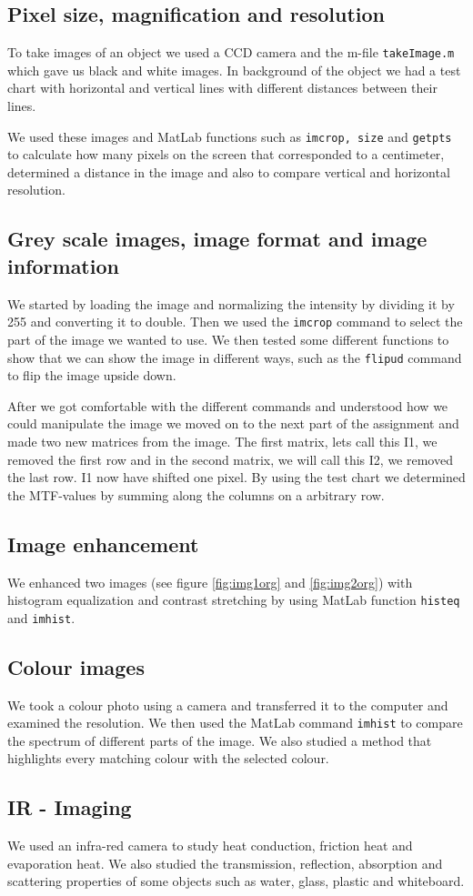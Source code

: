 \subsection{Pixel size, magnification and resolution}
To take images of an object we used a CCD camera and the m-file \texttt{takeImage.m} which gave us black and white images. In background of the object we had a test chart with horizontal and vertical lines with different distances between their lines. 

We used these images and MatLab functions such as \texttt{imcrop, size} and \texttt{getpts} to calculate how many pixels on the screen that corresponded to a centimeter, determined a distance in the image and also to compare vertical and horizontal resolution. 

\subsection{Grey scale images, image format and image information}
We started by loading the image and normalizing the intensity by dividing it by 255 and converting it to double. Then we used the \texttt{imcrop} command to select the part of the image we wanted to use. We then tested some different functions to show that we can show the image in different ways, such as the \texttt{flipud} command to flip the image upside down. 

After we got comfortable with the different commands and understood how we could manipulate the image we moved on to the next part of the assignment and made two new matrices from the image. The first matrix, lets call this I1, we removed the first row and in the second matrix, we will call this I2, we removed the last row. I1 now have shifted one pixel.
By using the test chart we determined the MTF-values by summing along the columns on a arbitrary row.

\subsection{Image enhancement}
We enhanced two images (see figure \ref{fig:img1org} and \ref{fig:img2org}) with histogram equalization and contrast stretching by using MatLab function \texttt{histeq} and \texttt{imhist}. 

\subsection{Colour images}
We took a colour photo using a camera and transferred it to the computer and examined the resolution. We then used the MatLab command \texttt{imhist} to compare the spectrum of different parts of the image. %
We also studied a method that highlights every matching colour with the selected colour.

\subsection{IR - Imaging}
We used an infra-red camera to study heat conduction, friction heat and evaporation heat. We also studied the transmission, reflection, absorption and scattering properties of some objects such as water, glass, plastic and whiteboard.